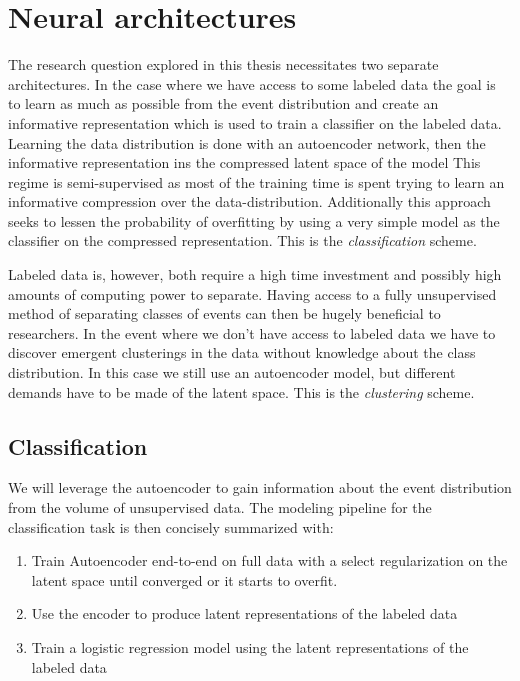 \section{Neural architectures}\label{sec:architectures}

The research question explored in this thesis necessitates two separate architectures. In the case where we have access to some labeled data the goal is to learn as much as possible from the event distribution and create an informative representation which is used to train a classifier on the labeled data. Learning the data distribution is done with an autoencoder network, then the informative representation ins the compressed latent space of the model This regime is semi-supervised as most of the training time is spent trying to learn an informative compression over the data-distribution. Additionally this approach seeks to lessen the probability of overfitting by using a very simple model as the classifier on the compressed representation. This is the \textit{classification} scheme.

Labeled data is, however, both require a high time investment and possibly high amounts of computing power to separate. Having access to a fully unsupervised method of separating classes of events can then be hugely beneficial to researchers. In the event where we don't have access to labeled data we have to discover emergent clusterings in the data without knowledge about the class  distribution. In this case we still use an autoencoder model, but different demands have to be made of the latent space. This is the \textit{clustering} scheme. 

\subsection{Classification}
We will leverage  the autoencoder to gain information about the event distribution from the volume of unsupervised data. The modeling pipeline for the classification task is then concisely summarized with: 

\begin{enumerate}
\item Train Autoencoder end-to-end on full data with a select regularization on the latent space until converged or it starts to overfit. 
\item Use the encoder to produce latent representations of the labeled data 
\item Train a logistic regression model using the latent representations of the labeled data 
\end{enumerate}

